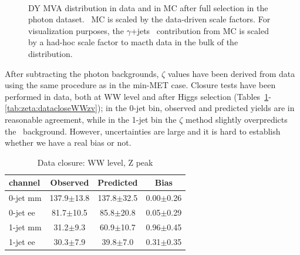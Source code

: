 \begin{figure}[!hbtp]
\begin{center}
\\
\caption{DY MVA distribution in data and in MC after full selection in the photon dataset. 
\Wjets\ MC is scaled by the data-driven scale factors.
For visualization purposes, the $\gamma$+jets~ contribution from MC is scaled by a had-hoc scale factor to macth data in the bulk of the distribution.
}
\label{fig:dymva_scaled}
\end{center}
\end{figure}

After subtracting the photon backgrounds, $\zeta$ values have been derived from data using the same procedure as in the min-MET case.
Closure tests have been performed in data, both at WW level and after Higgs selection (Tables~\ref{tab:zeta:datacloseWWzp}-\ref{tab:zeta:datacloseWWzv});
in the 0-jet bin, observed and predicted yields are in reasonable agreement, while in the 1-jet bin the $\zeta$ method slightly overpredicts the \dyll\ background.
However, uncertainties are large and it is hard to establish whether we have a real bias or not.

\begin{table}[!hbtp]
{
 \begin{center}
 \begin{tabular}{l | c c c}
 \hline
channel       & Observed & Predicted & Bias \\
 \hline
0-jet  mm  &  137.9$\pm$13.8  &  137.8$\pm$32.5  &   0.00$\pm$0.26    \\
0-jet  ee  &   81.7$\pm$10.5  &   85.8$\pm$20.8  &   0.05$\pm$0.29    \\
 \hline
1-jet  mm  &   31.2$\pm$9.3   &   60.9$\pm$10.7  &   0.96$\pm$0.45    \\
1-jet  ee  &   30.3$\pm$7.9   &   39.8$\pm$7.0   &   0.31$\pm$0.35    \\
 \hline
\end{tabular}
\end{center}
}
\caption{Data closure: WW level, Z peak}
\label{tab:zeta:datacloseWWzp}
\end{table}

